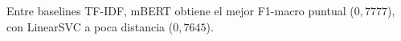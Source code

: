 Entre baselines TF-IDF, mBERT obtiene el mejor F1-macro puntual ($0{,}7777$), con LinearSVC a poca distancia ($0{,}7645$).
